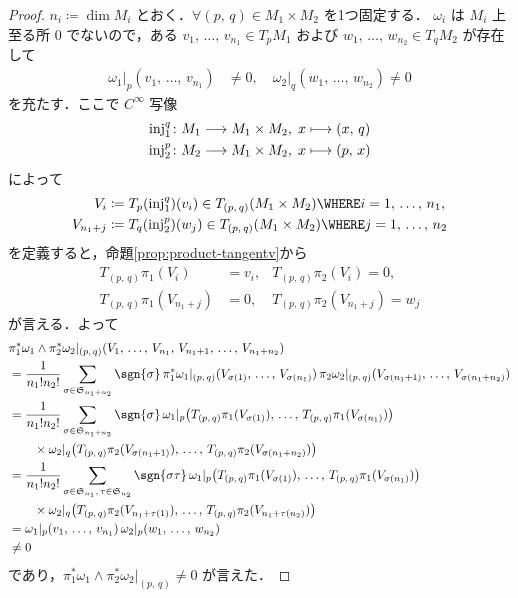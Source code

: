 \documentclass[geometry_main]{subfiles}
\begin{document}
\begin{proof}
	$n_i \coloneqq \dim M_i$ とおく．$\forall (p,\, q) \in M_1 \times M_2$ を1つ固定する．
	$\omega_i$ は $M_i$ 上至る所 $0$ でないので，ある $v_1,\, \dots,\, v_{n_1} \in T_p M_1$ および $w_1,\, \dots,\, w_{n_2} \in T_q M_2$ が存在して
	\begin{align}
		\omega_1|_p (v_1,\, \dots,\, v_{n_1}) &\neq 0, \quad
		\omega_2|_q (w_1,\, \dots,\, w_{n_2}) \neq 0
	\end{align}
	を充たす．ここで $C^\infty$ 写像
	\begin{align}
		\mathrm{inj}_1^{q} &\colon M_1 \longrightarrow M_1 \times M_2,\; x \longmapsto (x,\, q) \\
		\mathrm{inj}_2^{p} &\colon M_2 \longrightarrow M_1 \times M_2,\; x \longmapsto (p,\, x)
	\end{align}
	によって
	\begin{align}
		V_i &\coloneqq T_{p} (\mathrm{inj}_1^{q}) (v_i) \in T_{(p,\, q)} (M_1 \times M_2) \WHERE i = 1,\, \dots,\, n_1, \\ 
		V_{n_1 + j} &\coloneqq T_q(\mathrm{inj}_2^{p})(w_j) \in T_{(p,\, q)} (M_1 \times M_2) \WHERE j = 1,\, \dots,\, n_2
	\end{align}
	を定義すると，命題\ref{prop:product-tangentv}から
	\begin{align}
		T_{(p,\, q)} \pi_1 (V_i) &= v_i, & T_{(p,\, q)} \pi_2 (V_i) = 0, \\
		T_{(p,\, q)} \pi_1 (V_{n_1 + j}) &= 0, & T_{(p,\, q)} \pi_2 (V_{n_1+j}) = w_j
	\end{align}
	が言える．よって
	\begin{align}
		&\pi_1^* \omega_1 \wedge \pi_2^* \omega_2|_{(p,\, q)} (V_1,\, \dots,\, V_{n_1},\, V_{n_1 + 1},\, \dots,\, V_{n_1 + n_2}) \\
		&= \frac{1}{n_1 ! n_2 !} \sum_{\sigma \in \mathfrak{S}_{n_1 + n_2}} \sgn{\sigma}\, \pi_1^* \omega_1|_{(p,\, q)} (V_{\sigma(1)},\, \dots,\, V_{\sigma(n_1)})\, \pi_2\omega_2|_{(p,\, q)} (V_{\sigma(n_1 + 1)},\, \dots,\, V_{\sigma(n_1 + n_2)}) \\
		&= \frac{1}{n_1 ! n_2 !} \sum_{\sigma \in \mathfrak{S}_{n_1 + n_2}} \sgn{\sigma}\, \omega_1|_p \bigl( T_{(p,\, q)} \pi_1(V_{\sigma(1)}),\, \dots,\, T_{(p,\, q)} \pi_1(V_{\sigma(n_1)})\bigr)\\
		&\qquad \times \omega_2|_q \bigl(T_{(p,\, q)} \pi_2 (V_{\sigma(n_1 + 1)}),\, \dots,\, T_{(p,\, q)} \pi_2(V_{\sigma(n_1 + n_2)})\bigr) \\
		&= \frac{1}{n_1 ! n_2 !} \sum_{\sigma \in \mathfrak{S}_{n_1},\, \tau \in \mathfrak{S}_{n_2}} \sgn{\sigma \tau}\, \omega_1|_p \bigl( T_{(p,\, q)} \pi_1(V_{\sigma(1)}),\, \dots,\, T_{(p,\, q)} \pi_1(V_{\sigma(n_1)})\bigr)\\
		&\qquad \times \omega_2|_q \bigl(T_{(p,\, q)} \pi_2 (V_{n_1+\tau(1)}),\, \dots,\, T_{(p,\, q)} \pi_2(V_{n_1 + \tau(n_2)})\bigr) \\
		&= \omega_1|_p (v_1,\, \dots,\, v_{n_1})\,  \omega_2|_p (w_1,\, \dots,\, w_{n_2}) \\
		&\neq 0
	\end{align}
	であり，$\pi_1^* \omega_1 \wedge \pi_2^* \omega_2|_{(p,\, q)} \neq 0$ が言えた．
\end{proof}
\end{document}
